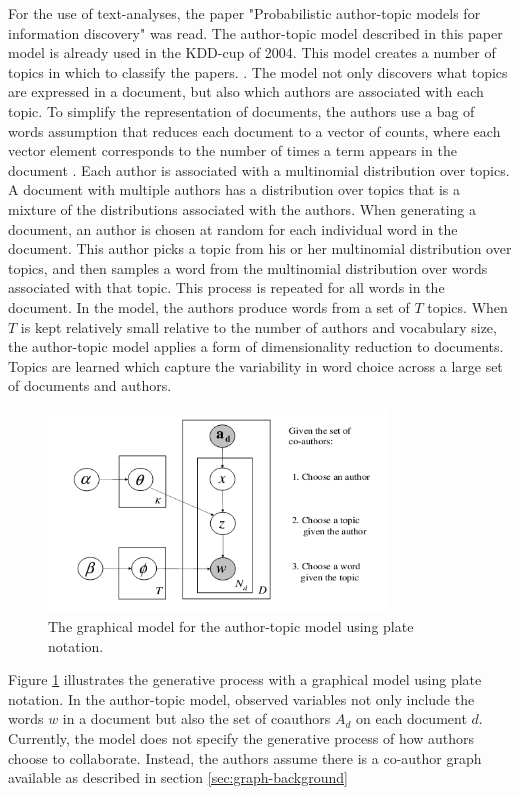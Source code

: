 

For the use of text-analyses, the paper "Probabilistic author-topic models for information discovery" was read. The author-topic model described in this paper model is already used in the KDD-cup of 2004. This  model creates a number of topics in which to classify the papers.  \cite{steyvers2004probabilistic}. The model not only discovers what topics are expressed in a document, but also which authors are associated with each topic. To simplify the representation of documents, the authors use a bag of words assumption that reduces each document to a vector of counts, where each vector element corresponds to the number of times a term appears in the document \cite{chowdhury2010introduction}. Each author is associated with a multinomial distribution over topics. A document with multiple authors has a distribution over topics that is a mixture of the distributions associated with the authors. When generating a document, an author is chosen at random for each individual word in the document. This author picks a topic from his or her multinomial distribution over topics, and then samples a word from the multinomial distribution over words associated with that topic. This process is repeated for all words in the document. In the model, the authors produce words from a set of $T$ topics. When $T$ is kept relatively small relative to the number of authors and vocabulary size, the author-topic model applies a form of dimensionality reduction to documents. Topics are learned which capture the variability in word choice across a large set of documents and authors. 

\begin{figure}[H]
\begin{center}
	\centering
	\includegraphics[width=0.8\textwidth]{./Images/model.png}
	\caption{The graphical model for the author-topic
model using plate notation.\cite{steyvers2004probabilistic} \label{fig:model}}
\end{center}
\end{figure}

Figure \ref{fig:model} illustrates the generative process with a graphical model using plate notation. In the author-topic model, observed variables not only include the words $w$ in a document but also the set of coauthors $A_d$ on each document $d$. Currently, the model does not specify the generative process of how authors choose to collaborate. Instead, the authors assume there is a co-author graph available as described in section \ref{sec:graph-background}
